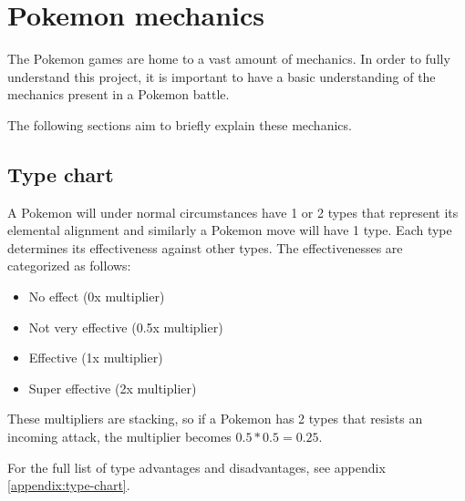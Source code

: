 \section{Pokemon mechanics}
\label{sec:pokemon-mechanics}

The Pokemon games are home to a vast amount of mechanics. In order to fully understand
this project, it is important to have a basic understanding of the mechanics present in a Pokemon battle.

The following sections aim to briefly explain these mechanics.

\subsection{Type chart}
A Pokemon will under normal circumstances have 1 or 2 types that represent its elemental alignment and similarly a Pokemon move will have 1 type.
Each type determines its effectiveness against other types. The effectivenesses are categorized as follows:
\begin{itemize}
  \item No effect (0x multiplier)
  \item Not very effective (0.5x multiplier)
  \item Effective (1x multiplier)
  \item Super effective (2x multiplier)
\end{itemize}
These multipliers are stacking, so if a Pokemon has 2 types that resists an incoming attack, the multiplier becomes $ 0.5*0.5=0.25 $.

For the full list of type advantages and disadvantages, see appendix \ref{appendix:type-chart}.

